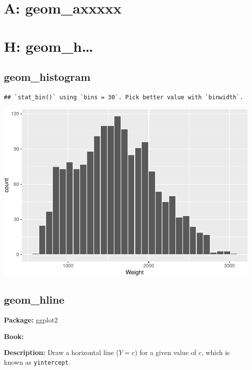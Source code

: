 \documentclass[
]{book}
\begin{document}
\hypertarget{a-geom_axxxxx}{%
\chapter{A: geom\_axxxxx}\label{a-geom_axxxxx}}

\hypertarget{h-geom_h}{%
\chapter{H: geom\_h\ldots{}}\label{h-geom_h}}

\hypertarget{histogram}{%
\section{geom\_histogram}\label{histogram}}

\begin{verbatim}
## `stat_bin()` using `bins = 30`. Pick better value with `binwidth`.
\end{verbatim}

\includegraphics{Data-Visualisation-geom-Encyclopedia_files/figure-latex/unnamed-chunk-39-1.pdf}

\hypertarget{hline}{%
\section{geom\_hline}\label{hline}}

\textbf{Package: } ggplot2 \autocite{R-ggplot2}

\textbf{Book: }

\textbf{Description: } Draw a horizontal line (\(Y=c\)) for a given value of \(c\), which is known as \texttt{yintercept}.
\end{document}
